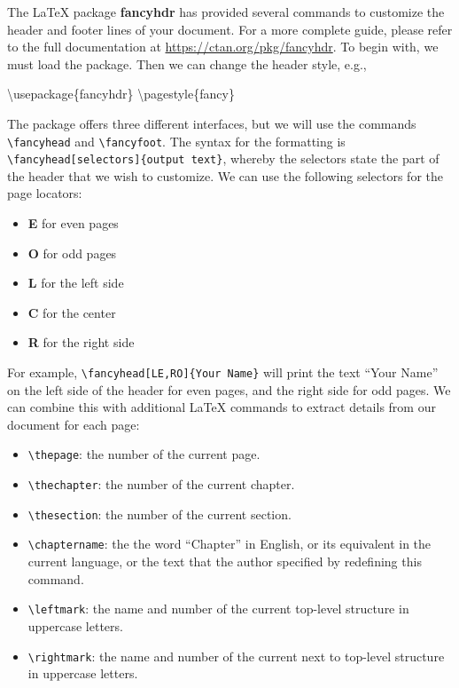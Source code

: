 \documentclass[
  11pt,
]{krantz}
\newenvironment{Shaded}{\begin{snugshade}}{\end{snugshade}}
\newcommand{\BuiltInTok}[1]{#1}
\newcommand{\ExtensionTok}[1]{#1}
\newcommand{\FunctionTok}[1]{\textcolor[rgb]{0,0,0}{#1}}
\newcommand{\NormalTok}[1]{#1}
\providecommand{\tightlist}{%
  \setlength{\itemsep}{0pt}\setlength{\parskip}{0pt}}
\begin{document}
The LaTeX package \textbf{fancyhdr} has provided several commands to customize the header and footer lines of your document. For a more complete guide, please refer to the full documentation at \url{https://ctan.org/pkg/fancyhdr}. To begin with, we must load the package. Then we can change the header style, e.g.,

\begin{Shaded}
\begin{Highlighting}[]
\BuiltInTok{\textbackslash{}usepackage}\NormalTok{\{}\ExtensionTok{fancyhdr}\NormalTok{\}}
\FunctionTok{\textbackslash{}pagestyle}\NormalTok{\{fancy\}}
\end{Highlighting}
\end{Shaded}

The package offers three different interfaces, but we will use the commands \texttt{\textbackslash{}fancyhead} and \texttt{\textbackslash{}fancyfoot}. The syntax for the formatting is \texttt{\textbackslash{}fancyhead{[}selectors{]}\{output\ text\}}, whereby the selectors state the part of the header that we wish to customize. We can use the following selectors for the page locators:

\begin{itemize}
\tightlist
\item
  \textbf{E} for even pages
\item
  \textbf{O} for odd pages
\item
  \textbf{L} for the left side
\item
  \textbf{C} for the center
\item
  \textbf{R} for the right side
\end{itemize}

For example, \texttt{\textbackslash{}fancyhead{[}LE,RO{]}\{Your\ Name\}} will print the text ``Your Name'' on the left side of the header for even pages, and the right side for odd pages. We can combine this with additional LaTeX commands to extract details from our document for each page:

\begin{itemize}
\tightlist
\item
  \texttt{\textbackslash{}thepage}: the number of the current page.
\item
  \texttt{\textbackslash{}thechapter}: the number of the current chapter.
\item
  \texttt{\textbackslash{}thesection}: the number of the current section.
\item
  \texttt{\textbackslash{}chaptername}: the the word ``Chapter'' in English, or its equivalent in the current language, or the text that the author specified by redefining this command.
\item
  \texttt{\textbackslash{}leftmark}: the name and number of the current top-level structure in uppercase letters.
\item
  \texttt{\textbackslash{}rightmark}: the name and number of the current next to top-level structure in uppercase letters.
\end{itemize}
\end{document}
